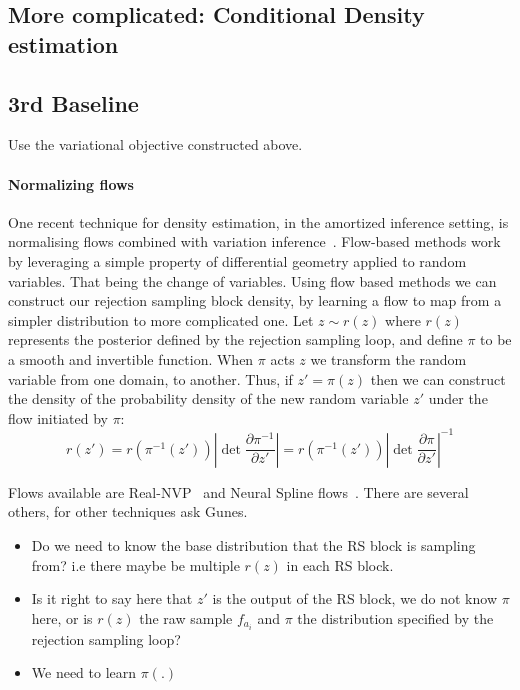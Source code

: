 \documentclass{article}
\begin{document}
\subsection{More complicated: Conditional Density estimation}

\subsection{3rd Baseline}
 
Use the variational objective constructed above. 

\paragraph{Normalizing flows} One recent technique for density estimation, in the amortized inference setting,
is normalising flows combined with variation inference~\cite{rezende2015variational}.
Flow-based methods work by leveraging a simple property of differential geometry applied 
to random variables. 
That being the change of variables. 
Using flow based methods we can construct our rejection sampling block density, by learning a flow to map from
a simpler distribution to more complicated one.
Let $z \sim r(z)$ where $r(z)$ represents the posterior defined by the rejection
sampling loop, and define $\pi$ to be a smooth and invertible function.
When $\pi$ acts $z$ we transform the random variable from one domain, to another. 
Thus, if $z\prime = \pi(z)$ then we can construct the density of  
the probability density of the new random variable $z\prime$ under the flow initiated by $\pi$: 
\begin{equation}
r(z\prime) = r(\pi^{-1}(z\prime)) \left|\det \frac{\partial \pi^{-1}}{\partial z'}\right| = r(\pi^{-1}(z\prime)) \left|\det \frac{\partial \pi}{\partial z\prime}\right|^{-1} 
\end{equation}

Flows available are Real-NVP~\cite{dinh2016density} and Neural Spline flows~\cite{durkan2019neural}.
There are several others, for other techniques ask Gunes. 

\begin{itemize}
  \item Do we need to know the base distribution that the RS block is sampling from? i.e there maybe be multiple $r(z)$ in each 
  RS block. 
  \item Is it right to say here that $z\prime$ is the output of the RS block, we do not know $\pi$ here, or is $r(z)$ the raw sample $f_{a_i}$ and $\pi$ the distribution specified by the rejection sampling loop? 
  \item We need to learn $\pi(.)$
\end{itemize}
\end{document}
